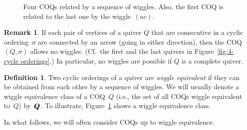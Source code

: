 \documentclass[11pt, letterpaper]{amsart}
\newcommand{\wiggleQ}{Q \hspace{-7pt} Q}%
\theoremstyle{definition}
\newtheorem{remark}[theorem]{Remark}
\newtheorem{example}[theorem]{Example}
\newtheorem{definition}[theorem]{Definition}
\numberwithin{equation}{section}
\begin{document}
{\vspace{-2pt}

\begin{figure}[ht]
\newcommand{\h}[0]{1.5cm}

\raisebox{\h}{$\stackrel{(bd)}{\longleftrightarrow}$}
\raisebox{\h}{$\stackrel{(ac)}{\longleftrightarrow}$}
\raisebox{\h}{$\stackrel{(bd)}{\longleftrightarrow}$}
\caption{Four COQs related by a sequence of wiggles. 
Also, the first COQ is related to the last one by the wiggle~$(ac)$.}
\label{fig:4-cycle-wiggles}
\end{figure}
} %

\vspace{-7pt}

\begin{remark} 
If each pair of vertices of a quiver $Q$ that are consecutive in a cyclic ordering~$\sigma$ 
are connected by an arrow (going in either direction), then the COQ $(Q,\sigma)$ allows no wiggles. 
(Cf.\ the first and the last quivers in Figure~\ref{fig:4-cycle orderings}.)
In particular, no wiggles are possible if $Q$ is a complete quiver. 
\end{remark}

\begin{definition} 
\label{def:wiggle equiv}
Two cyclic orderings of a quiver are \emph{wiggle equivalent} if they can be obtained from each other by a sequence of wiggles. 
We will usually denote a wiggle equivalence class of a COQ~$Q$ (i.e., the set of all COQs wiggle equivalent to~$Q$) 
by~$\wiggleQ$.
To illustrate, Figure~\ref{fig:4-cycle-wiggles} shows a wiggle equivalence class. 
\end{definition}


In what follows, we will often consider COQs up to wiggle equivalence. 

\end{document}
